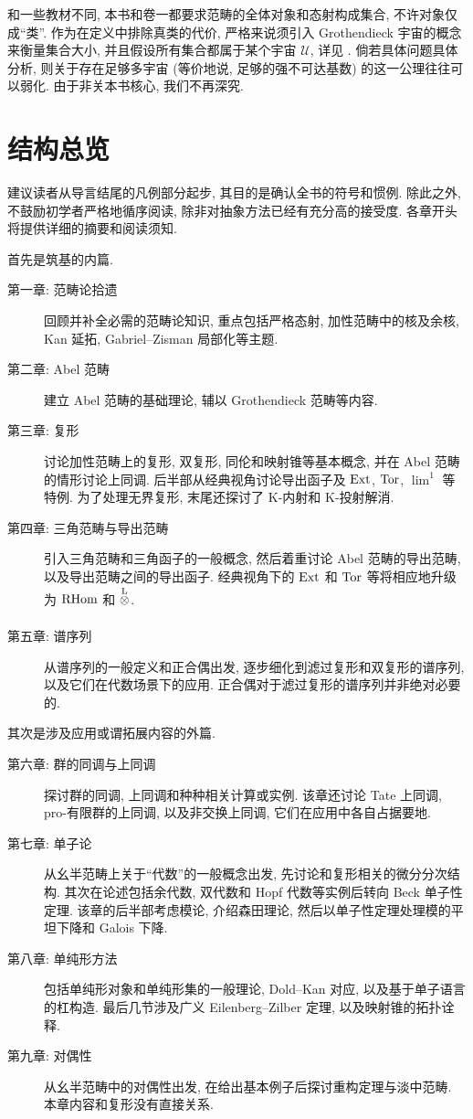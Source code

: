 和一些教材不同, 本书和卷一都要求范畴的全体对象和态射构成集合, 不许对象仅成``类''. 作为在定义中排除真类的代价, 严格来说须引入 Grothendieck 宇宙的概念来衡量集合大小, 并且假设所有集合都属于某个宇宙 $\mathcal{U}$, 详见 \cite[假设 1.5.2, 注记 1.5.6]{Li1}. 倘若具体问题具体分析, 则关于存在足够多宇宙 (等价地说, 足够的强不可达基数) 的这一公理往往可以弱化. 由于非关本书核心, 我们不再深究.

\section*{结构总览}
建议读者从导言结尾的凡例部分起步, 其目的是确认全书的符号和惯例. 除此之外, 不鼓励初学者严格地循序阅读, 除非对抽象方法已经有充分高的接受度. 各章开头将提供详细的摘要和阅读须知.

首先是筑基的内篇.

\begin{description}
	\item[第一章: 范畴论拾遗] 回顾并补全必需的范畴论知识, 重点包括严格态射, 加性范畴中的核及余核, Kan 延拓, Gabriel--Zisman 局部化等主题.
	\item[第二章: Abel 范畴] 建立 Abel 范畴的基础理论, 辅以 Grothendieck 范畴等内容.
	\item[第三章: 复形] 讨论加性范畴上的复形, 双复形, 同伦和映射锥等基本概念, 并在 Abel 范畴的情形讨论上同调. 后半部从经典视角讨论导出函子及 $\operatorname{Ext}$, $\operatorname{Tor}$, $\lim^1$ 等特例. 为了处理无界复形, 末尾还探讨了 K-内射和 K-投射解消.
	\item[第四章: 三角范畴与导出范畴] 引入三角范畴和三角函子的一般概念, 然后着重讨论 Abel 范畴的导出范畴, 以及导出范畴之间的导出函子. 经典视角下的 $\operatorname{Ext}$ 和 $\operatorname{Tor}$ 等将相应地升级为 $\operatorname{RHom}$ 和 $\underset{}{\overset{\mathrm{L}}{\otimes}}$.
	\item[第五章: 谱序列] 从谱序列的一般定义和正合偶出发, 逐步细化到滤过复形和双复形的谱序列, 以及它们在代数场景下的应用. 正合偶对于滤过复形的谱序列并非绝对必要的.
\end{description}

其次是涉及应用或谓拓展内容的外篇.
\begin{description}
	\item[第六章: 群的同调与上同调] 探讨群的同调, 上同调和种种相关计算或实例. 该章还讨论 Tate 上同调, pro-有限群的上同调, 以及非交换上同调, 它们在应用中各自占据要地.
	\item[第七章: 单子论] 从幺半范畴上关于``代数''的一般概念出发, 先讨论和复形相关的微分分次结构. 其次在论述包括余代数, 双代数和 Hopf 代数等实例后转向 Beck 单子性定理. 该章的后半部考虑模论, 介绍森田理论, 然后以单子性定理处理模的平坦下降和 Galois 下降.
	\item[第八章: 单纯形方法] 包括单纯形对象和单纯形集的一般理论, Dold--Kan 对应, 以及基于单子语言的杠构造. 最后几节涉及广义 Eilenberg--Zilber 定理, 以及映射锥的拓扑诠释.
	\item[第九章: 对偶性] 从幺半范畴中的对偶性出发, 在给出基本例子后探讨重构定理与淡中范畴. 本章内容和复形没有直接关系.
\end{description}

